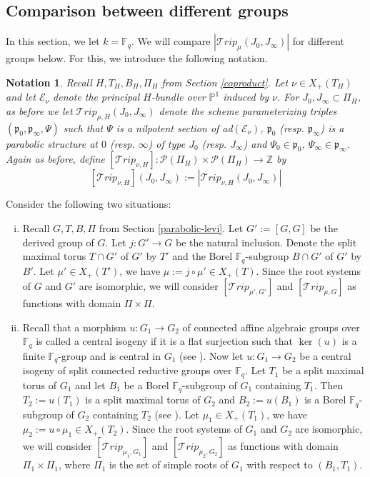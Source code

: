 \documentclass{amsart}
\newcommand{\cE}{\mathcal{E}}
\theoremstyle{plain}
\newtheorem{notation}{Notation}[section]
\theoremstyle{definition}
\theoremstyle{remark}
\begin{document}
\subsection{Comparison between different groups}\label{comparison}
In this section, we let $k=\mathbb{F}_{q}$. We will compare $|\mathcal{T}rip_{\mu}(J_{0},J_{\infty})|$ for different groups below. For this, we introduce the following notation.
\begin{notation}\label{comparison2} Recall $H,T_{H},B_{H},\Pi_{H}$ from Section \ref{coproduct}. Let $\nu\in X_{+}(T_{H})$ and let $\cE_{\nu}$ denote the principal $H$-bundle over $\mathbb{P}^1$ induced by $\nu$. For $J_{0},J_{\infty}\subset\Pi_{H}$, as before we let $\mathcal{T}rip_{\mu,H}(J_{0},J_{\infty})$ denote the scheme parameterizing triples $(\mathfrak{p}_{0},\mathfrak{p}_{\infty},\Psi)$ such that $\Psi$ is a nilpotent section of ad$(\cE_{\nu})$, $\mathfrak{p}_{0}$ (resp. $\mathfrak{p}_{\infty}$) is a parabolic structure at $0$ (resp. $\infty$) of type $J_{0}$ (resp. $J_{\infty}$) and $\Psi_{0}\in \mathfrak{p}_{0}$,  $\Psi_{\infty}\in \mathfrak{p}_{\infty}$. Again as before, define $[\mathcal{T}rip_{\nu,H}]:\mathcal{P}(\Pi_{H})\times\mathcal{P}(\Pi_{H})\rightarrow\mathbb{Z}$ by
\[
[\mathcal{T}rip_{\nu,H}](J_{0},J_{\infty}):=|\mathcal{T}rip_{\nu,H}(J_{0},J_{\infty})|
\]
\end{notation}
Consider the following two situations:
\begin{enumerate}[(i)]
\item Recall $G,T,B,\Pi$ from Section \ref{parabolic-levi}. Let $G':=[G,G]$ be the derived group of $G$. Let $j:G'\rightarrow G$ be the natural inclusion. Denote the split maximal torus $T\cap G'$ of $G'$ by $T'$ and the Borel $\mathbb{F}_{q}$-subgroup $B\cap G'$ of $G'$ by $B'$. Let $\mu'\in X_{+}(T')$, we have $\mu:=j\circ\mu'\in X_{+}(T)$. Since the root systems of $G$ and $G'$ are isomorphic, we will consider $[\mathcal{T}rip_{\mu',G'}]$ and $[\mathcal{T}rip_{\mu,G}]$ as functions with domain $\Pi\times\Pi$.
\item Recall that a morphism $u:G_{1}\rightarrow G_{2}$ of connected affine algebraic groups over $\mathbb{F}_{q}$ is called a central isogeny if it is a flat surjection such that $\ker(u)$ is a finite $\mathbb{F}_{q}$-group and is central in $G_{1}$ (see \cite[Definition 18.1]{Mil1}). Now let $u:G_{1}\rightarrow G_{2}$ be a central isogeny of split connected reductive groups over $\mathbb{F}_{q}$. Let $T_{1}$ be a split maximal torus of $G_{1}$ and let $B_{1}$ be a Borel $\mathbb{F}_{q}$-subgroup of $G_{1}$ containing $T_{1}$. Then $T_{2}:=u(T_{1})$ is a split maximal torus of $G_{2}$ and $B_{2}:=u(B_{1})$ is a Borel $\mathbb{F}_{q}$-subgroup of $G_{2}$ containing $T_{2}$ (see \cite[Proposition 17.20]{Mil1}).
Let $\mu_{1}\in X_{+}(T_1)$, we have $\mu_{2}:=u\circ\mu_{1}\in X_{+}(T_{2})$. Since the root systems of $G_1$ and $G_2$ are isomorphic, we will consider $[\mathcal{T}rip_{\mu_{1},G_{1}}]$ and $[\mathcal{T}rip_{\mu_{2},G_{2}}]$ as functions with domain $\Pi_{1}\times\Pi_{1}$, where $\Pi_{1}$ is the set of simple roots of $G_1$ with respect to $(B_{1},T_{1})$. 
\end{enumerate}
\end{document}
